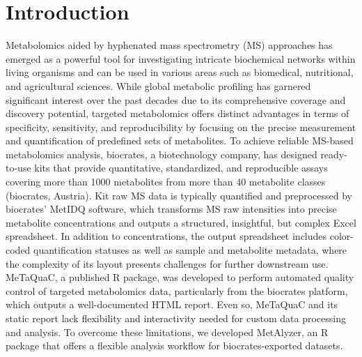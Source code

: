 \documentclass[12pt, a4paper]{article}
\begin{document}
\section*{\large Introduction}
Metabolomics aided by hyphenated mass spectrometry (MS) approaches has emerged as a powerful tool for investigating intricate biochemical networks within living organisms and can be used in various areas such as biomedical, nutritional, and agricultural sciences\cite{Gowda2008,Gomez-Casati2013,Gonzalez-Covarrubias2022}. While global metabolic profiling has garnered significant interest over the past decades due to its comprehensive coverage and discovery potential, targeted metabolomics offers distinct advantages in terms of specificity, sensitivity, and reproducibility by focusing on the precise measurement and quantification of predefined sets of metabolites\cite{Begou2017}. To achieve reliable MS-based metabolomics analysis, biocrates, a biotechnology company, has designed ready-to-use kits that provide quantitative, standardized, and reproducible assays covering more than 1000 metabolites from more than 40 metabolite classes (biocrates, Austria). Kit raw MS data is typically quantified and preprocessed by biocrates' MetIDQ software, which transforms MS raw intensities into precise metabolite concentrations and outputs a structured, insightful, but complex Excel spreadsheet. In addition to concentrations, the output spreadsheet includes color-coded quantification statuses as well as sample and metabolite metadata, where the complexity of its layout presents challenges for further downstream use. MeTaQuaC\cite{Kuhring2020}, a published R package, was developed to perform automated quality control of targeted metabolomics data, particularly from the biocrates platform, which outputs a well-documented HTML report. Even so, MeTaQuaC and its static report lack flexibility and interactivity needed for custom data processing and analysis. To overcome these limitations, we developed MetAlyzer, an R package that offers a flexible analysis workflow for biocrates-exported datasets.
\end{document}
